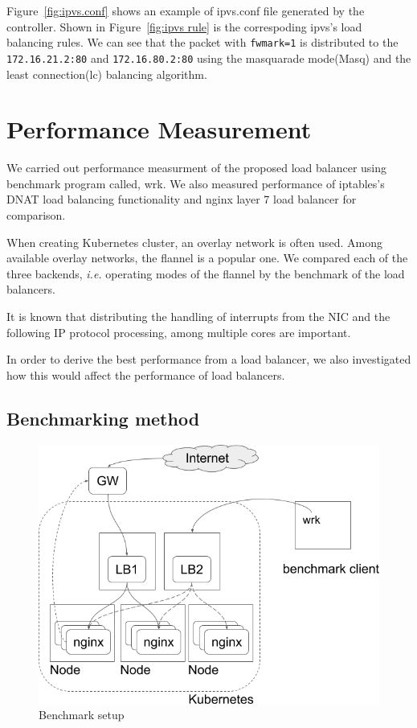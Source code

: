 Figure~\ref{fig:ipvs.conf} shows an example of ipvs.conf file generated by the controller. 
Shown in Figure~\ref{fig:ipvs rule} is the correspoding ipvs's load balancing rules.
We can see that the packet with {\tt fwmark=1}\cite{BertHubert2002} is distributed 
to the {\tt 172.16.21.2:80} and {\tt 172.16.80.2:80} 
using the masquarade mode(Masq)\cite{Zhang2000} and 
the least connection(lc)\cite{Zhang2000} balancing algorithm.   

\section{Performance Measurement}\label{Performance Measurement}

We carried out performance measurment of the proposed load balancer using benchmark program called, wrk\cite{Glozer2016}.
We also measured performance of iptables's DNAT load balancing functionality and nginx layer 7 load balancer for comparison.

When creating Kubernetes cluster, an overlay network\cite{Sill2016,Marmol2015} is often used. 
Among available overlay networks, the flannel\cite{CoreOSFlannel} is a popular one.
We compared each of the three backends\cite{CoreOSFlannelBackend}, 
{\it i.e.} operating modes of the flannel by the benchmark of the load balancers.

It is known that distributing the handling of interrupts from the NIC 
and the following IP protocol processing, among multiple cores are important.

In order to derive the best performance from a load balancer, 
we also investigated how this would affect the performance of load balancers.

\subsection{Benchmarking method}

\begin{figure}
\includegraphics[width=\columnwidth]{Figs/benchmark-schem}
\caption{Benchmark setup}
\label{fig:benchmark-schem}
\end{figure}

